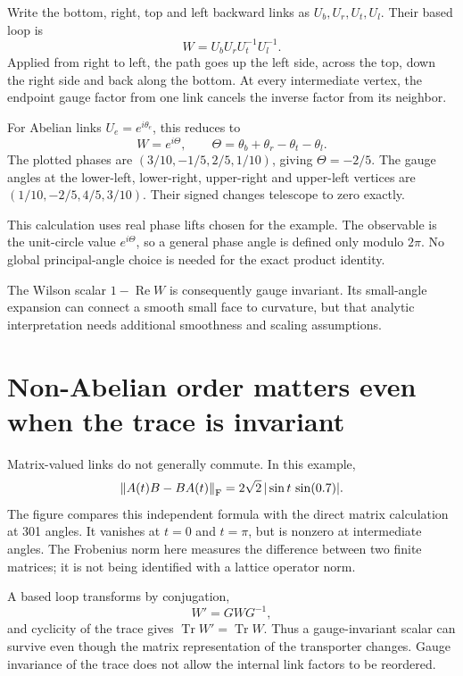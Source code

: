 Write the bottom, right, top and left backward links as $U_b,U_r,U_t,U_l$. Their based loop is
\[
W=U_bU_rU_t^{-1}U_l^{-1}.
\]
Applied from right to left, the path goes up the left side, across the top, down the right side and back along the bottom. At every intermediate vertex, the endpoint gauge factor from one link cancels the inverse factor from its neighbor.

For Abelian links $U_e=e^{i\theta_e}$, this reduces to
\[
W=e^{i\Theta},\qquad
\Theta=\theta_b+\theta_r-\theta_t-\theta_l.
\]
The plotted phases are $(3/10,-1/5,2/5,1/10)$, giving $\Theta=-2/5$. The gauge angles at the lower-left, lower-right, upper-right and upper-left vertices are $(1/10,-2/5,4/5,3/10)$. Their signed changes telescope to zero exactly.

This calculation uses real phase lifts chosen for the example. The observable is the unit-circle value $e^{i\Theta}$, so a general phase angle is defined only modulo $2\pi$. No global principal-angle choice is needed for the exact product identity.

The Wilson scalar $1-\operatorname{Re}W$ is consequently gauge invariant. Its small-angle expansion can connect a smooth small face to curvature, but that analytic interpretation needs additional smoothness and scaling assumptions.



\clearpage
\section{Non-Abelian order matters even when the trace is invariant}

Matrix-valued links do not generally commute. In this example,
\[
\left\lVert A(t)B-BA(t)\right\rVert_{\mathrm F}
=2\sqrt2\,|\sin t\,\sin(0.7)|.
\]
The figure compares this independent formula with the direct matrix calculation at 301 angles. It vanishes at $t=0$ and $t=\pi$, but is nonzero at intermediate angles. The Frobenius norm here measures the difference between two finite matrices; it is not being identified with a lattice operator norm.

A based loop transforms by conjugation,
\[
W'=GWG^{-1},
\]
and cyclicity of the trace gives $\operatorname{Tr}W'=\operatorname{Tr}W$. Thus a gauge-invariant scalar can survive even though the matrix representation of the transporter changes. Gauge invariance of the trace does not allow the internal link factors to be reordered.

